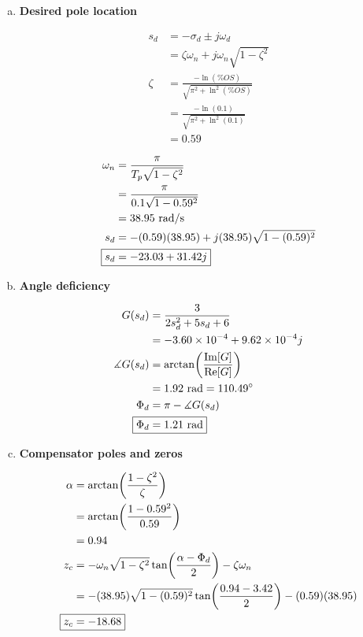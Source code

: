 \documentclass[12pt,a4paper]{article}
\begin{document}
\begin{enumerate}[a)]

\item \textbf{Desired pole location}

\begin{align}
	s_d &= -\sigma_d \pm j\omega_d \\
	&= \zeta\omega_n + j\omega_n\sqrt{1 - \zeta^2} \\
	\zeta &= \frac{-\ln(\%OS)}{\sqrt{\pi^2 + \ln^2(\%OS)}} \\
	&= \frac{-\ln(0.1)}{\sqrt{\pi^2 + \ln^2(0.1)}} \\
	&= 0.59 \label{eq:zeta}
\end{align}

\begin{align}
	\omega_n &= \frac{\pi}{T_p\sqrt{1 - \zeta^2}} \\
	&= \frac{\pi}{0.1\sqrt{1 - 0.59^2}} \\
	&= 38.95 \textrm{ rad/s} \label{eq:natural-frequency} \\
	s_d &= -(0.59)(38.95) + j(38.95)\sqrt{1 - (0.59)^2} \\
	\Aboxed{
		s_d &= -23.03 + 31.42j
	} \label{eq:sd}
\end{align}

\item \textbf{Angle deficiency}

\begin{align}
	G(s_d) &= \frac{3}{2s_d^2 + 5s_d + 6} \\
	&= -3.60\times 10^{-4} + 9.62\times 10^{-4} j \\
	\measuredangle G(s_d) &= \arctan(\frac{\Im[G]}{\Re[G]}) \\
	&= 1.92 \textrm{ rad} = 110.49^\circ \\
	\Phi_d &= \pi - \measuredangle G(s_d) \\
	\Aboxed{
		\Phi_d &= 1.21 \textrm{ rad}
	} \label{eq:angle-def}
\end{align}

\item \textbf{Compensator poles and zeros}

\begin{align}
	\alpha &= \arctan(\frac{1 - \zeta^2}{\zeta}) \\
	&= \arctan(\frac{1 - 0.59^2}{0.59}) \\
	&= 0.94 \\
	z_c &= -\omega_n \sqrt{1 - \zeta^2} \tan(\frac{\alpha - \Phi_d}{2}) - \zeta\omega_n \\
	&= -(38.95)\sqrt{1 - (0.59)^2} \tan(\frac{0.94 - 3.42}{2}) - (0.59)(38.95) \\
	\Aboxed{
		z_c &= -18.68
	} \label{eq:zc}
\end{align}


\end{enumerate}
\end{document}
